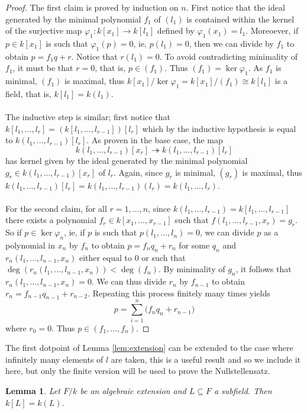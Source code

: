 \documentclass[12pt]{article}
\theoremstyle{plain}
\newtheorem{lemma}[thm]{Lemma}
\theoremstyle{definition}
\begin{document}
\begin{proof}
The first claim is proved by induction on $n$. First notice that the ideal generated by the minimal polynomial $f_1$ of $(l_1)$ is contained within the kernel of the surjective map $\varphi_1: k[x_1] \to k[l_1]$ defined by $\varphi_1(x_1) = l_1$. Moreoever, if $p \in k[x_1]$ is such that $\varphi_1(p) = 0$, ie, $p(l_1) = 0$, then we can divide by $f_1$ to obtain $p = f_1 q + r$. Notice that $r(l_1) = 0$. To avoid contradicting minimality of $f_1$, it must be that $r = 0$, that is, $p \in (f_1)$. Thus $(f_1) = \operatorname{ker}\varphi_1$. As $f_1$ is minimal, $(f_1)$ is maximal, thus $k[x_1]/\operatorname{ker}\varphi_1 = k[x_1]/(f_1) \cong k[l_1]$ is a field, that is, $k[l_1] = k(l_1)$.\\\\
%
The inductive step is similar; first notice that $k[l_1,...,l_r] = (k[l_1,...,l_{r-1}])[l_r]$ which by the inductive hypothesis is equal to $k(l_1,...,l_{r-1})[l_r]$. As proven in the base case, the map
\[k(l_1,...,l_{r-1})[x_r] \twoheadrightarrow k(l_1,...,l_{r-1})[l_r]\]
has kernel given by the ideal generated by the minimal polynomial $g_r \in k(l_1,...,l_{r-1})[x_r]$ of $l_r$. Again, since $g_r$ is minimal, $(g_r)$ is maximal, thus $k(l_1,...,l_{r-1})[l_r] = k(l_1,...,l_{r-1})(l_r) = k(l_1,...,l_r)$.\\\\
%
For the second claim, for all $r = 1,...,n$, since $k(l_1,...,l_{r-1}) = k[l_1,...,l_{r-1}]$ there exists a polynomial $f_r \in k[x_1,...,x_{r-1}]$ such that $f(l_1,...,l_{r-1},x_r) = g_r$. So if $p \in \operatorname{ker}\varphi_n$, ie, if $p$ is such that $p(l_1,...,l_n) = 0$, we can divide $p$ as a polynomial in $x_n$ by $f_n$ to obtain $p = f_n q_n + r_n$ for some $q_n$ and $r_n(l_1,...,l_{n-1},x_n)$ either equal to $0$ or such that $\operatorname{deg}(r_n(l_1,...,l_{n-1},x_n)) < \operatorname{deg}(f_n)$. By minimality of $g_n$, it follows that $r_n(l_1,...,l_{n-1},x_n) = 0$. We can thus divide $r_n$ by $f_{n-1}$ to obtain $r_n = f_{n-1}q_{n-1} + r_{n-2}$. Repeating this process finitely many times yields
\[p = \sum_{i =1}^n \big(f_nq_n + r_{n-1}\big)\]
where $r_0 = 0$. Thus $p \in (f_1,...,f_n)$.
\end{proof}
The first dotpoint of Lemma \ref{lem:extension} can be extended to the case where infinitely many elements of $l$ are taken, this is a useful result and so we include it here, but only the finite version will be used to prove the Nullstellensatz.
\begin{lemma}
\label{lem:ext_infinite}
Let $F/k$ be an algebraic extension and $L \subseteq F$ a subfield. Then $k[L] = k(L)$.
\end{lemma}
\end{document}
